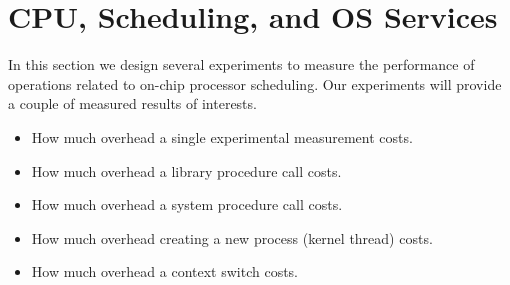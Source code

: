 \section{CPU, Scheduling, and OS Services }
\label{sec:cpu}
In this section we design several experiments to measure the performance of operations related to on-chip processor scheduling. Our experiments will provide a couple of measured results of interests.
\begin{itemize}
\item How much overhead a single experimental measurement costs.
\item How much overhead a library procedure call costs.
\item How much overhead a system procedure call costs.
\item How much overhead creating a new process (kernel thread) costs.
\item How much overhead a context switch costs.
\end{itemize}



